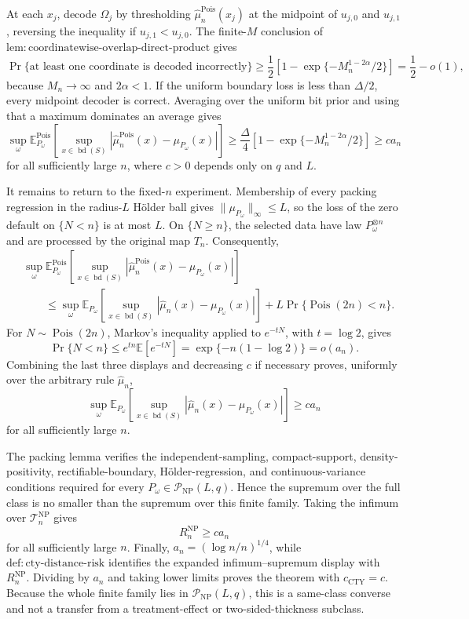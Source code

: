 At each \(x_j\), decode \(\Omega_j\) by thresholding \(\widehat\mu_n^{\mathrm{Pois}}(x_j)\) at the midpoint of \(u_{j,0}\) and \(u_{j,1}\), reversing the inequality if \(u_{j,1}<u_{j,0}\).  The finite-\(M\) conclusion of \(\mathrm{lem:coordinatewise\text{-}overlap\text{-}direct\text{-}product}\) gives
\[
 \Pr\{\text{at least one coordinate is decoded incorrectly}\}
 \geq\frac12\left[1-\exp\{-M_n^{1-2\alpha}/2\}\right]
 =\frac12-o(1),
\]
because \(M_n\to\infty\) and \(2\alpha<1\).  If the uniform boundary loss is less than \(\Delta/2\), every midpoint decoder is correct.  Averaging over the uniform bit prior and using that a maximum dominates an average gives
\[
 \sup_\omega
 \mathbb E_{P_\omega}^{\mathrm{Pois}}\!\left[
 \sup_{x\in\operatorname{bd}(S)}
 |\widehat\mu_n^{\mathrm{Pois}}(x)-\mu_{P_\omega}(x)|
 \right]
 \geq\frac{\Delta}{4}
 \left[1-\exp\{-M_n^{1-2\alpha}/2\}\right]
 \geq c a_n
\]
for all sufficiently large \(n\), where \(c>0\) depends only on \(q\) and \(L\).

It remains to return to the fixed-\(n\) experiment.  Membership of every packing regression in the radius-\(L\) H\"older ball gives \(\lVert\mu_{P_\omega}\rVert_\infty\leq L\), so the loss of the zero default on \(\{N<n\}\) is at most \(L\).  On \(\{N\geq n\}\), the selected data have law \(P_\omega^{\otimes n}\) and are processed by the original map \(T_n\).  Consequently,
\[
\begin{aligned}
 &\sup_\omega
 \mathbb E_{P_\omega}^{\mathrm{Pois}}\!\left[
 \sup_{x\in\operatorname{bd}(S)}
 |\widehat\mu_n^{\mathrm{Pois}}(x)-\mu_{P_\omega}(x)|
 \right]\\
 &\qquad\leq
 \sup_\omega
 \mathbb E_{P_\omega}\!\left[
 \sup_{x\in\operatorname{bd}(S)}
 |\widehat\mu_n(x)-\mu_{P_\omega}(x)|
 \right]
 +L\Pr\{\operatorname{Pois}(2n)<n\}.
\end{aligned}
\]
For \(N\sim\operatorname{Pois}(2n)\), Markov's inequality applied to \(e^{-tN}\), with \(t=\log2\), gives
\[
 \Pr\{N<n\}
 \leq e^{tn}\mathbb E[e^{-tN}]
 =\exp\{-n(1-\log2)\}
 =o(a_n).
\]
Combining the last three displays and decreasing \(c\) if necessary proves, uniformly over the arbitrary rule \(\widehat\mu_n\),
\[
 \sup_\omega
 \mathbb E_{P_\omega}\!\left[
 \sup_{x\in\operatorname{bd}(S)}
 |\widehat\mu_n(x)-\mu_{P_\omega}(x)|
 \right]
 \geq c a_n
\]
for all sufficiently large \(n\).

The packing lemma verifies the independent-sampling, compact-support, density-positivity, rectifiable-boundary, H\"older-regression, and continuous-variance conditions required for every \(P_\omega\in\mathcal P_{\mathrm{NP}}(L,q)\).  Hence the supremum over the full class is no smaller than the supremum over this finite family.  Taking the infimum over \(\mathcal T_n^{\mathrm{NP}}\) gives
\[
 R_n^{\mathrm{NP}}\geq c a_n
\]
for all sufficiently large \(n\).  Finally, \(a_n=(\log n/n)^{1/4}\), while \(\mathrm{def:cty\text{-}distance\text{-}risk}\) identifies the expanded infimum--supremum display with \(R_n^{\mathrm{NP}}\).  Dividing by \(a_n\) and taking lower limits proves the theorem with \(c_{\mathrm{CTY}}=c\).  Because the whole finite family lies in \(\mathcal P_{\mathrm{NP}}(L,q)\), this is a same-class converse and not a transfer from a treatment-effect or two-sided-thickness subclass.